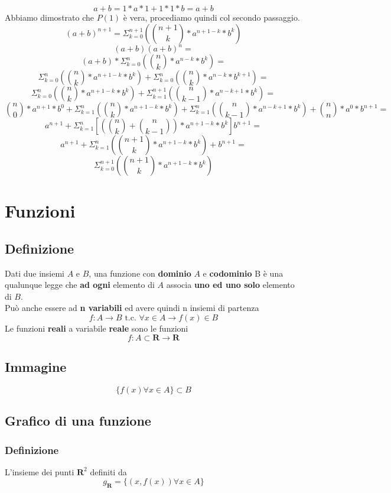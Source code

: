 \documentclass{report}
\begin{document}
    $$a+b = 1 * a * 1 + 1 * 1 * b = a + b$$
    Abbiamo dimostrato che $P\left(1\right)$ è vera, procediamo quindi col secondo passaggio.
    $$\left(a+b\right)^{n+1} = \Sigma_{k=0}^{n+1}\left(\binom{n+1}{k} * a^{n+1-k} * b^k\right)$$
    $$\left(a+b\right)\left(a+b\right)^n = $$ 
    $$\left(a+b\right) * \Sigma_{k=0}^{n}\left(\binom{n}{k} * a^{n-k} * b^k\right) = $$
    $$\Sigma_{k=0}^{n}\left(\binom{n}{k} * a^{n+1-k} * b^k\right) + 
        \Sigma_{k=0}^{n}\left(\binom{n}{k} * a^{n-k} * b^{k+1}\right) = $$ 
    $$\Sigma_{k=0}^{n}\left(\binom{n}{k} * a^{n+1-k} * b^k\right) +  
        \Sigma_{k=1}^{n+1}\left(\binom{n}{k-1} * a^{n-k+1} * b^k\right) = $$ 
    $$\binom{n}{0} * a^{n+1} * b^0 + \Sigma_{k=1}^{n}\left(\binom{n}{k} * a^{n+1-k} * b^k\right) +
        \Sigma_{k=1}^{n}\left(\binom{n}{k-1} * a^{n-k+1} * b^k\right) + \binom{n}{n} * a^0 * b^{n+1} = $$
    $$a^{n+1} + 
        \Sigma_{k=1}^{n}\left[\left(\binom{n}{k} + \binom{n}{k-1}\right) * a^{n+1-k} * b^k\right]
        b^{n+1} = $$ 
    $$a^{n+1} + \Sigma_{k=1}^{n}\left(\binom{n+1}{k} * a^{n+1-k} * b^k\right) + b^{n+1} = $$
    $$\Sigma_{k=0}^{n+1}\left(\binom{n+1}{k} * a^{n+1-k} * b^{k}\right)$$
\section{Funzioni}
    \subsection{Definizione}
        Dati due insiemi $A$ e $B$, una funzione con \textbf{dominio} $A$ e 
        \textbf{codominio} B è una qualunque legge che \textbf{ad ogni} elemento
        di $A$ associa \textbf{uno ed uno solo} elemento di $B$.\\
        Può anche essere ad \textbf{n variabili} ed avere quindi n insiemi di partenza
        $$f: A \longrightarrow B \textrm{ t.c. } \forall x \in A \longrightarrow f(x) \in B$$
        Le funzioni \textbf{reali} a variabile \textbf{reale} sono le funzioni
        $$f: A \subset \mathbf{R} \longrightarrow \mathbf{R}$$
    \subsection{Immagine}
        $$ \{f(x) \forall x \in A\} \subset B $$
    \subsection{Grafico di una funzione}
        \subsubsection{Definizione}
            L'insieme dei punti $\mathbf{R}^2$ definiti da 
            $$ g_{\mathbf{R}} = \{(x,f(x)) \forall x \in A\}$$
\end{document}
